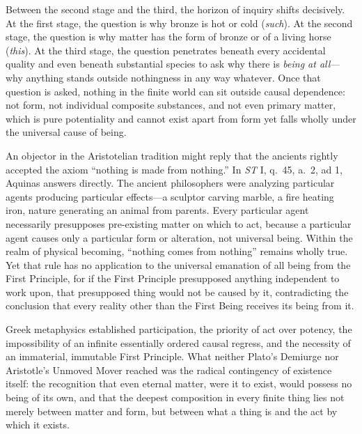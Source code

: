 Between the second stage and the third, the horizon of inquiry shifts decisively. At the first stage, the question is why bronze is hot or cold (\emph{such}). At the second stage, the question is why matter has the form of bronze or of a living horse (\emph{this}). At the third stage, the question penetrates beneath every accidental quality and even beneath substantial species to ask why there is \emph{being at all}---why anything stands outside nothingness in any way whatever. Once that question is asked, nothing in the finite world can sit outside causal dependence: not form, not individual composite substances, and not even primary matter, which is pure potentiality and cannot exist apart from form yet falls wholly under the universal cause of being.

An objector in the Aristotelian tradition might reply that the ancients rightly accepted the axiom ``nothing is made from nothing.'' In \emph{ST} I, q.\ 45, a.\ 2, ad 1, Aquinas answers directly. The ancient philosophers were analyzing particular agents producing particular effects---a sculptor carving marble, a fire heating iron, nature generating an animal from parents. Every particular agent necessarily presupposes pre-existing matter on which to act, because a particular agent causes only a particular form or alteration, not universal being. Within the realm of physical becoming, ``nothing comes from nothing'' remains wholly true. Yet that rule has no application to the universal emanation of all being from the First Principle, for if the First Principle presupposed anything independent to work upon, that presupposed thing would not be caused by it, contradicting the conclusion that every reality other than the First Being receives its being from it.

Greek metaphysics established participation, the priority of act over potency, the impossibility of an infinite essentially ordered causal regress, and the necessity of an immaterial, immutable First Principle. What neither Plato's Demiurge nor Aristotle's Unmoved Mover reached was the radical contingency of existence itself: the recognition that even eternal matter, were it to exist, would possess no being of its own, and that the deepest composition in every finite thing lies not merely between matter and form, but between what a thing is and the act by which it exists.
